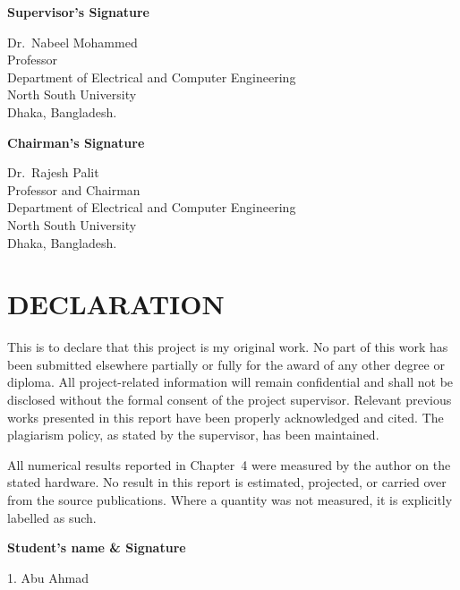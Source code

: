 \documentclass[12pt,a4paper,oneside]{report}
\begin{document}
\vspace{40pt}
\textbf{Supervisor's Signature}

\vspace{25pt}
\dotfill

Dr.\ Nabeel Mohammed\\
Professor\\
Department of Electrical and Computer Engineering\\
North South University\\
Dhaka, Bangladesh.

\vspace{35pt}
\textbf{Chairman's Signature}

\vspace{25pt}
\dotfill

Dr.\ Rajesh Palit\\
Professor and Chairman\\
Department of Electrical and Computer Engineering\\
North South University\\
Dhaka, Bangladesh.

\chapter*{DECLARATION}

This is to declare that this project is my original work. No part of this work
has been submitted elsewhere partially or fully for the award of any other
degree or diploma. All project-related information will remain confidential and
shall not be disclosed without the formal consent of the project supervisor.
Relevant previous works presented in this report have been properly
acknowledged and cited. The plagiarism policy, as stated by the supervisor, has
been maintained.

All numerical results reported in Chapter~4 were measured by the author on the
stated hardware. No result in this report is estimated, projected, or carried
over from the source publications. Where a quantity was not measured, it is
explicitly labelled as such.

\vspace{50pt}
\textbf{Student's name \& Signature}

\vspace{35pt}
1. Abu Ahmad
\end{document}
